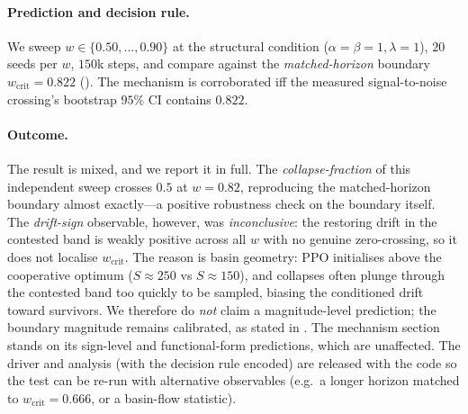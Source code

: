 \documentclass[11pt]{article}
\newcommand{\wcrit}{w_{\mathrm{crit}}}
\begin{document}
\paragraph{Prediction and decision rule.} We sweep
$w\in\{0.50,\dots,0.90\}$ at the structural condition
($\alpha{=}\beta{=}1,\lambda{=}1$), $20$ seeds per $w$, $150$k steps, and
compare against the \emph{matched-horizon} boundary $\wcrit=0.822$
(). The mechanism is corroborated iff the
measured signal-to-noise crossing's bootstrap $95\%$ CI contains $0.822$.

\paragraph{Outcome.} The result is mixed, and we report it in full. The
\emph{collapse-fraction} of this independent sweep crosses $0.5$ at
$w=0.82$, reproducing the matched-horizon boundary almost exactly---a
positive robustness check on the boundary itself. The \emph{drift-sign}
observable, however, was \emph{inconclusive}: the restoring drift in the
contested band is weakly positive across all $w$ with no genuine
zero-crossing, so it does not localise $\wcrit$. The reason is basin
geometry: PPO initialises above the cooperative optimum ($S{\approx}250$ vs
$S{\approx}150$), and collapses often plunge through the contested band too
quickly to be sampled, biasing the conditioned drift toward survivors. We
therefore do \emph{not} claim a magnitude-level prediction; the boundary
magnitude remains calibrated, as stated in . The mechanism
section stands on its sign-level and functional-form predictions, which are
unaffected. The driver and analysis (with the decision rule encoded) are
released with the code so the test can be re-run with alternative
observables (e.g.\ a longer horizon matched to $\wcrit=0.666$, or a
basin-flow statistic).



\end{document}
